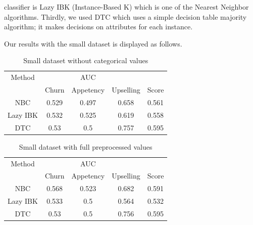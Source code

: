 \documentclass[journal]{IEEEtran}
\begin{document}
classifier is Lazy IBK (Instance-Based K) which is one of the Nearest
Neighbor algorithms. Thirdly, we used DTC which uses a simple decision
table majority algorithm; it makes decisions on attributes for each
instance.
\par
Our results with the small dataset is displayed as follows.

\begin{table}
[!t]
\centering
\caption{Small dataset without categorical values}
\label{tab:small-dataset-1}
\begin{tabular}
{ccccc}
\toprule
Method & ~ & AUC & ~ & ~\\
~ & Churn & Appetency & Upselling & Score\\
\hline
NBC & 0.529 & 0.497 & 0.658 & 0.561\\
Lazy IBK & 0.532  & 0.525 & 0.619 & 0.558\\
DTC & 0.53 & 0.5 & 0.757 & 0.595\\
\bottomrule
\end{tabular}
\end{table}

\begin{table}
[!t]
\centering
\caption{Small dataset with full preprocessed values}
\label{tab:small-dataset-2}
\begin{tabular}
{ccccc}
\toprule
Method & ~ & AUC & ~ & ~\\
~ & Churn & Appetency & Upselling & Score\\
\hline
NBC & 0.568 & 0.523 & 0.682 & 0.591\\
Lazy IBK & 0.533  & 0.5 & 0.564 & 0.532\\
DTC & 0.53 & 0.5 & 0.756 & 0.595\\
\bottomrule
\end{tabular}
\end{table}
\end{document}
